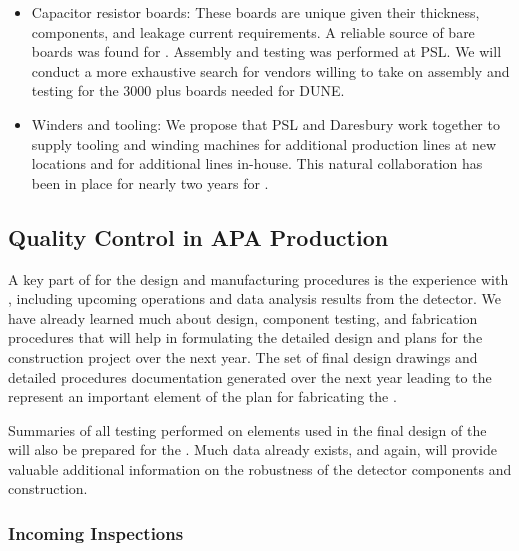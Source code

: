 \begin{itemize}
\item Capacitor resistor boards: These boards are unique given their thickness, 
 components, and leakage current requirements. A reliable source of bare boards was found for . Assembly and testing was performed at PSL. We will conduct a more exhaustive search for vendors willing to take on assembly and testing for the \num{3000} plus boards needed for DUNE.

\item Winders and tooling: We propose that PSL and Daresbury work together to supply tooling and winding machines for additional production lines at new locations and for additional lines in-house. This natural collaboration has been in place for nearly two years for .

\end{itemize}


\subsection{Quality Control in APA Production}
\label{sec:fdsp-apa-prod-qc}

A key part of  for the  design and manufacturing procedures is the experience with , including upcoming operations and data analysis results from the detector.  We have already learned much about design, component testing, and fabrication procedures that will help in formulating the detailed design and plans for the %
 construction project over the next year.  The set of final design drawings and detailed procedures documentation generated over the next year leading to the  represent an important element of the  plan for fabricating the .  

Summaries of all  testing performed on elements used in the final design of the  will also be prepared for the .  Much data already exists, and again,  will provide valuable additional information on the robustness of the detector components and construction.  


\subsubsection{Incoming Inspections}

